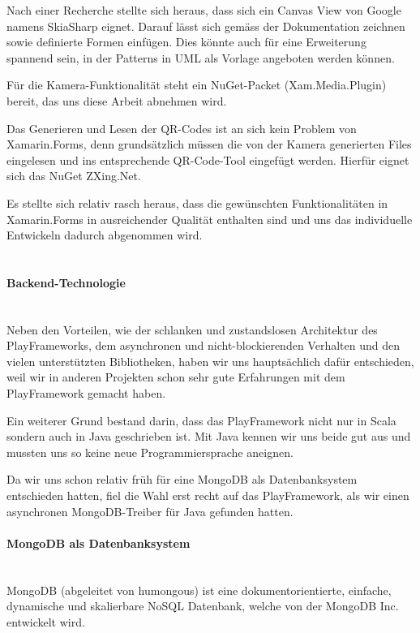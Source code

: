 Nach einer Recherche stellte sich heraus, dass sich ein Canvas View von Google namens SkiaSharp eignet. Darauf lässt sich gemäss der Dokumentation zeichnen sowie definierte Formen einfügen. Dies könnte auch für eine Erweiterung spannend sein, in der Patterns in UML als Vorlage angeboten werden können.

Für die Kamera-Funktionalität steht ein NuGet-Packet (Xam.Media.Plugin) bereit, das uns diese Arbeit abnehmen wird.

Das Generieren und Lesen der QR-Codes ist an sich kein Problem von Xamarin.Forms, denn grundsätzlich müssen die von der Kamera generierten Files eingelesen und ins entsprechende QR-Code-Tool eingefügt werden. Hierfür eignet sich das NuGet ZXing.Net. 

Es stellte sich relativ rasch heraus, dass die gewünschten Funktionalitäten in Xamarin.Forms in ausreichender Qualität enthalten sind und uns das individuelle Entwickeln dadurch abgenommen wird.\\
\\


\paragraph*{Backend-Technologie}~\\

Neben den Vorteilen, wie der schlanken und zustandslosen Architektur des Play\-Frameworks, dem asynchronen und nicht-blockierenden Verhalten und den vielen unterstützten Bibliotheken, haben wir uns hauptsächlich dafür entschieden, weil wir in anderen Projekten schon sehr gute Erfahrungen mit dem PlayFramework gemacht haben.

Ein weiterer Grund bestand darin, dass das PlayFramework nicht nur in Scala sondern auch in Java geschrieben ist. Mit Java kennen wir uns beide gut aus und mussten uns so keine neue Programmiersprache aneignen.

Da wir uns schon relativ früh für eine MongoDB als Datenbanksystem entschieden hatten, fiel die Wahl erst recht auf das PlayFramework, als wir einen asynchronen MongoDB-Treiber für Java gefunden hatten.

\paragraph*{MongoDB als Datenbanksystem}~\\

MongoDB (abgeleitet von humongous) ist eine dokumentorientierte, einfache, dynamische und skalierbare NoSQL Datenbank, welche von der MongoDB Inc. entwickelt wird. 

